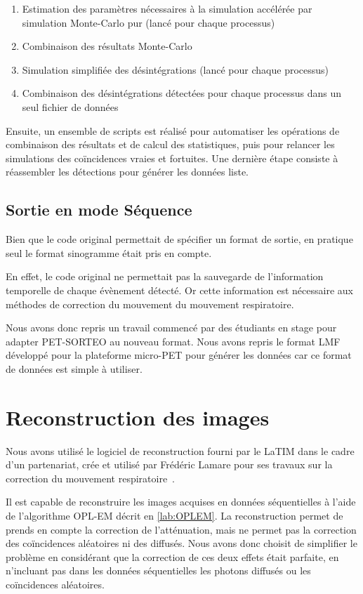     \begin{enumerate}
        \item Estimation des paramètres nécessaires à la simulation accélérée par simulation Monte-Carlo pur (lancé pour chaque processus)
        \item Combinaison des résultats Monte-Carlo
        \item Simulation simplifiée des désintégrations (lancé pour chaque processus)
        \item Combinaison des désintégrations détectées pour chaque processus dans un seul fichier de données
    \end{enumerate}

Ensuite, un ensemble de scripts est réalisé pour automatiser les opérations de combinaison des résultats et de calcul des statistiques, puis pour relancer les simulations des coïncidences vraies et fortuites. Une dernière étape consiste à réassembler les détections pour générer les données liste.

\subsection{Sortie en mode Séquence}

Bien que le code original permettait de spécifier un format de sortie, en pratique seul le format sinogramme était pris en compte. 

En effet, le code original ne permettait pas la sauvegarde de l'information temporelle de chaque évènement détecté. Or cette information est nécessaire aux méthodes de correction du mouvement du mouvement respiratoire. 

Nous avons donc repris un travail commencé par des étudiants en stage pour adapter PET-SORTEO au nouveau format. Nous avons repris le format LMF développé pour la plateforme micro-PET pour générer les données car ce format de données est simple à utiliser. 


\section{Reconstruction des images}

Nous avons utilisé le logiciel de reconstruction fourni par le LaTIM dans le cadre d'un partenariat, crée et utilisé par Frédéric Lamare pour ses travaux sur la correction du mouvement respiratoire~\cite{lamare2007list}.

Il est capable de reconstruire les images acquises en données séquentielles à l'aide de l'algorithme OPL-EM décrit en \ref{lab:OPLEM}. La reconstruction permet de prends en compte la correction de l'atténuation, mais ne permet pas la correction des coïncidences aléatoires ni des diffusés. Nous avons donc choisit de simplifier le problème en considérant que la correction de ces deux effets était parfaite, en n'incluant pas dans les données séquentielles les photons diffusés ou les coïncidences aléatoires.

